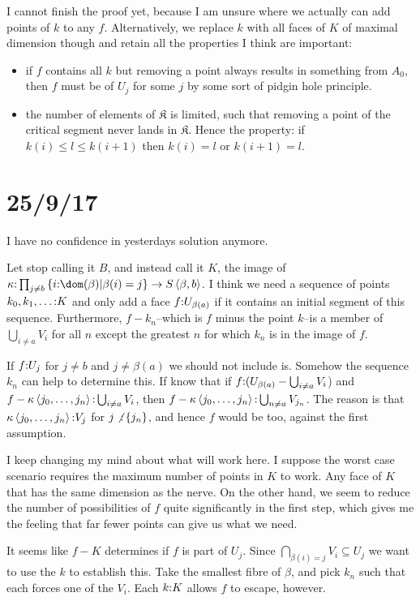 \documentclass[csh.tex]{subfiles}
\begin{document}
I cannot finish the proof yet, because I am unsure where we actually can add points of $k$ to any $f$. Alternatively, we replace $k$ with all faces of $K$ of maximal dimension though and retain all the properties I think are important:
\begin{itemize}
\item if $f$ contains all $k$ but removing a point always results in something from $A_0$, then $f$ must be of $U_j$ for some $j$ by some sort of pidgin hole principle.
\item the number of elements of $\mathfrak K$ is limited, such that removing a point of the critical segment never lands in $\mathfrak K$. Hence the property: if $k(i)\leq l \leq k(i+1)$ then $k(i) = l$ or $k(i+1) = l$.
\end{itemize}

\section{25/9/17}
I have no confidence in yesterdays solution anymore.

Let stop calling it $B$, and instead call it $K$, the image of $\kappa\of \prod_{j\neq b}\set{i\of\dom(\beta)|\beta(i)=j} \to S\tuplet{\beta,b}$. I think we need a sequence of points $k_0,k_1,\dots \mathord : K$ and only add a face $f\mathord : U_{\beta(a)}$ if it contains an initial segment of this sequence. Furthermore, $f-{k_n}$--which is $f$ minus the point $k$--is a member of $\bigcup_{i\neq a} V_i$ for all $n$ except the greatest $n$ for which $k_n$ is in the image of $f$.

If $f\mathord : U_j$ for $j\neq b$ and $j\neq\beta(a)$ we should not include is. Somehow the sequence $k_n$ can help to determine this. 
If know that if $f\mathord : (U_{\beta(a)} - \bigcup_{i\neq a} V_i$)
and $f - \kappa\left\langle j_0,\dotsc,j_n \right\rangle\mathord : \bigcup_{i\neq a} V_i$,
then $f - \kappa\left\langle j_0,\dotsc,j_n \right\rangle\mathord : \bigcup_{n\neq a} V_{j_n}$.
The reason is that $\kappa\left\langle j_0,\dotsc,j_n \right\rangle\mathord : V_j$ for $j\not\mathord :\left\{j_n\right\}$, and hence $f$ would be too, against the first assumption.

I keep changing my mind about what will work here. I suppose the worst case scenario requires the maximum number of points in $K$ to work. Any face of $K$ that has the same dimension as the nerve.
On the other hand, we seem to reduce the number of possibilities of $f$ quite significantly in the first step, which gives me the feeling that far fewer points can give us what we need.


It seems like $f-K$ determines if $f$ is part of $U_j$. Since $\bigcap_{\beta(i) = j} V_i \subseteq U_j$ we want to use the $k$ to establish this. Take the smallest fibre of $\beta$, and pick $k_n$ such that each forces one of the $V_i$. Each $k\mathord : K$ allows $f$ to escape, however.
\end{document}
